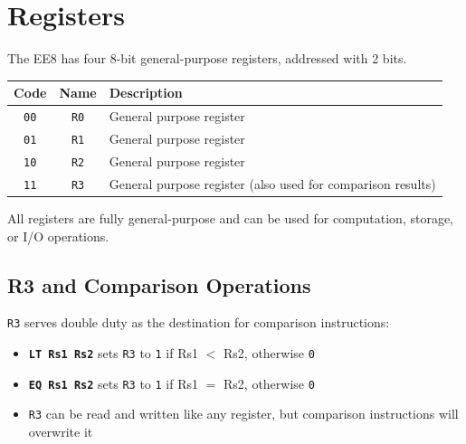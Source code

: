 \documentclass[11pt,a4paper]{article}
\newcommand{\reg}[1]{\texttt{R#1}}
\newcommand{\instr}[1]{\texttt{\textbf{#1}}}
\begin{document}
\section{Registers}

The EE8 has four 8-bit general-purpose registers, addressed with 2 bits.

\begin{table}[H]
\centering
\begin{tabular}{@{}ccl@{}}
\toprule
\textbf{Code} & \textbf{Name} & \textbf{Description} \\
\midrule
\texttt{00} & \reg{0} & General purpose register \\
\texttt{01} & \reg{1} & General purpose register \\
\texttt{10} & \reg{2} & General purpose register \\
\texttt{11} & \reg{3} & General purpose register (also used for comparison results) \\
\bottomrule
\end{tabular}
\end{table}

All registers are fully general-purpose and can be used for computation, storage, or I/O operations.

\subsection{R3 and Comparison Operations}

\reg{3} serves double duty as the destination for comparison instructions:
\begin{itemize}[nosep]
  \item \instr{LT Rs1 Rs2} sets \reg{3} to \texttt{1} if Rs1 $<$ Rs2, otherwise \texttt{0}
  \item \instr{EQ Rs1 Rs2} sets \reg{3} to \texttt{1} if Rs1 $=$ Rs2, otherwise \texttt{0}
  \item \reg{3} can be read and written like any register, but comparison instructions will overwrite it
\end{itemize}
\end{document}
